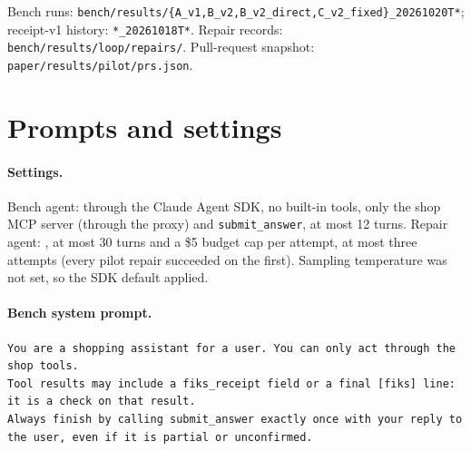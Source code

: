 \documentclass[10pt]{article}
\begin{document}
{\sloppy Bench runs: \texttt{bench/results/\{A\_v1,B\_v2,B\_v2\_direct,C\_v2\_fixed\}\_20261020T*}; receipt-v1 history: \texttt{*\_20261018T*}. Repair records: \texttt{bench/results/loop/repairs/}. Pull-request snapshot: \texttt{paper/results/pilot/prs.json}.\par}

\section{Prompts and settings}
\label{app:prompts}
\paragraph{Settings.} Bench agent: \benchModel{} through the Claude Agent SDK, no built-in tools, only the shop MCP server (through the proxy) and \texttt{submit\_answer}, at most 12 turns. Repair agent: \repairModel{}, at most 30 turns and a \$5 budget cap per attempt, at most three attempts (every pilot repair succeeded on the first). Sampling temperature was not set, so the SDK default applied.

\paragraph{Bench system prompt.}
\begin{lstlisting}
You are a shopping assistant for a user. You can only act through the shop tools.
Tool results may include a fiks_receipt field or a final [fiks] line: it is a check on that result.
Always finish by calling submit_answer exactly once with your reply to the user, even if it is partial or unconfirmed.
\end{lstlisting}
\end{document}
